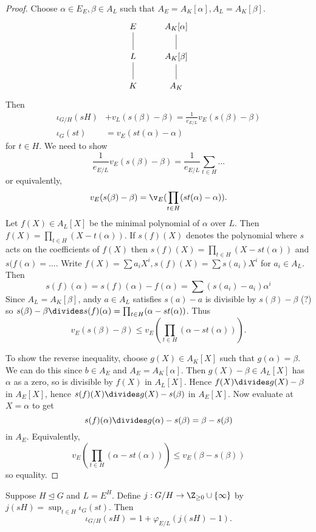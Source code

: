 \documentclass[a4paper]{article}
\begin{document}
\begin{proof}
  Choose \(\alpha \in E_E, \beta \in A_L\) such that \(A_E = A_K[\alpha], A_L = A_K[\beta]\).
  \[
    \begin{tikzcd}
      E \ar[d, dash] & A_K[\alpha] \ar[d, dash] \\
      L \ar[d, dash] & A_K[\beta] \ar[d, dash] \\
      K & A_K
    \end{tikzcd}
  \]
  Then
  \begin{align*}
    \iota_{G/H}(sH) &+ v_L(s(\beta) - \beta) = \frac{1}{e_{E/L}} v_E(s(\beta) - \beta) \\
    \iota_G(st) &= v_E(st(\alpha) - \alpha)
  \end{align*}
  for \(t \in H\). We need to show
  \[
     \frac{1}{e_{E/L}} v_E(s(\beta) - \beta) = \frac{1}{e_{E/L}} \sum_{t \in H} ...
  \]
  or equivalently,
  \[
    v_E(s(\beta) - \beta) = \v_E(\prod_{t \in H} (st(\alpha) - \alpha)).
  \]
  Let \(f(X) \in A_L[X]\) be the minimal polynomial of \(\alpha\) over \(L\). Then \(f(X) = \prod_{t \in H} (X - t(\alpha))\). If \(s(f)(X)\) denotes the polynomial where \(s\) acts on the coefficients of \(f(X)\) then \(s(f)(X) = \prod_{t \in H} (X - st(\alpha))\) and \(s(f(\alpha) = \dots\). Write \(f(X) = \sum a_i X^i, s(f)(X) = \sum s(a_i)X^i\) for \(a_i \in A_L\). Then
  \[
    s(f)(\alpha) = s(f)(\alpha) - f(\alpha) = \sum (s(a_i) - a_i) \alpha^i
  \]
  Since \(A_L = A_K[\beta]\), andy \(a \in A_L\) satisfies \(s(a) - a\) is divisible by \(s(\beta) - \beta\) (?) so \(s(\beta) - \beta \divides s(f)(\alpha) = \prod_{t \in H}(\alpha - st(\alpha))\). Thus
  \[
    v_E(s(\beta) - \beta) \leq v_E(\prod_{t \in H}(\alpha - st(\alpha))).
  \]

  To show the reverse inequality, choose \(g(X) \in A_K[X]\) such that \(g(\alpha) = \beta\). We can do this since \(b \in A_E\) and \(A_E = A_K[\alpha]\). Then \(g(X) - \beta \in A_L[X]\) has \(\alpha\) as a zero, so is divisible by \(f(X)\) in \(A_L[X]\). Hence \(f(X) \divides g(X) - \beta\) in \(A_E[X]\), hence \(s(f)(X) \divides g(X) - s(\beta)\) in \(A_E[X]\). Now evaluate at \(X = \alpha\) to get
  \[
    s(f)(\alpha) \divides g(\alpha) - s(\beta) = \beta - s(\beta)
  \]
  in \(A_E\). Equivalently,
  \[
    v_E(\prod_{t \in H}(\alpha - st(\alpha))) \leq v_E(\beta - s(\beta))
  \]
  so equality.
\end{proof}

\begin{lemma}
  Suppose \(H \trianglelefteq G\) and \(L = E^H\). Define \(j: G/H \to \Z_{\geq 0} \cup \{\infty\}\) by \(j(sH) = \sup_{t \in H} \iota_G(st)\). Then
  \[
    \iota_{G/H}(sH) = 1 + \varphi_{E/L}(j(sH) - 1).
  \]
\end{lemma}
\end{document}

